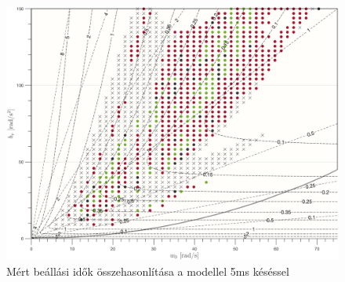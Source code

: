 \begin{figure}[H]
    \begin{center}
    \includegraphics[width=\textwidth]{images/experiment_comparison_0005.png}
    \caption{Mért beállási idők összehasonlítása a modellel 5ms késéssel}\label{fig:experiment_comparison_0005}
    \end{center}
\end{figure}